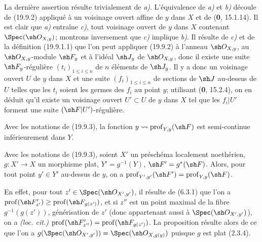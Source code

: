 La dernière assertion résulte trivialement de \emph{a)}. L'équivalence de \emph{a)} et \emph{b)} découle de (19.9.2) appliqué à un voisinage ouvert affine de $y$ dans $X$ et de (\textbf{0}, 15.1.14). Il est clair que \emph{a)} entraîne \emph{c)}, tout voisinage ouvert de $y$ dans $X$ contenant $\Spec(\sh O_{X,y})$; montrons inversement que \emph{c)} implique \emph{b)}. Il résulte de \emph{c)} et de la définition (19.9.1.1) que l'on
peut appliquer (19.9.2) à l'anneau $\sh O_{X,y}$, au $\sh O_{X,y}$-module $\sh F_y$ et à l'idéal $\sh J_y$ de $\sh O_{X,y}$, donc il existe une suite $\sh F_y$-régulière $(t_i)_{1\leq i\leq n}$ de $n$ éléments de $\sh J_y$. Il y a donc un voisinage ouvert $U$ de $y$ dans $X$ et une suite $(f_i)_{1\leq i\leq n}$ de sections de $\sh J$ au-dessus de $U$ telles que les $t_i$ soient les germes des $f_i$ au point $y$; utilisant (\textbf{0}, 15.2.4), on en déduit qu'il existe un voisinage ouvert $U'\subset U$ de $y$ dans $X$ tel que les $f_i|U'$ forment une suite $(\sh F|U')$-régulière.

\begin{corollary}[19.9.4]
\label{IV.19.9.4}
Avec les notations de \textup{(19.9.3)}, la fonction $y\leadsto\operatorname{prof}_{Y,y}(\sh F)$ est semi-continue inférieurement dans $Y$.
\end{corollary}

\begin{proposition}[19.9.5]
\label{IV.19.9.5}
Avec les notations de \textup{(19.9.3)}, soient $X'$ un préschéma localement noethérien, $g:X'\to X$ un morphisme plat, $Y'=g^{-1}(Y)$, $\sh F'=g^*(\sh F)$. Alors, pour tout point $y'\in Y'$ au-dessus de $y$, on a $\operatorname{prof}_{Y',y'}(\sh F')=\operatorname{prof}_{Y,y}(\sh F)$.
\end{proposition}

En effet, pour tout $z'\in\Spec(\sh O_{X',y'})$, il résulte de (6.3.1) que l'on a $\operatorname{prof}(\sh F'_{z'})\geq\operatorname{prof}(\sh F_{g(z')})$, et si $z''$ est un point maximal de la fibre $g^{-1}(g(z'))$, générisation de $z'$ (donc appartenant aussi à $\Spec(\sh O_{X',y'})$), on a \emph{(loc. cit.)} $\operatorname{prof}(\sh F'_{z''})=\operatorname{prof}(\sh F_{g(z')})$. La proposition résulte alors de ce que l'on a $g(\Spec(\sh O_{X',y'}))=\Spec(\sh O_{X,g(y)})$ puisque $g$ est plat (2.3.4).


